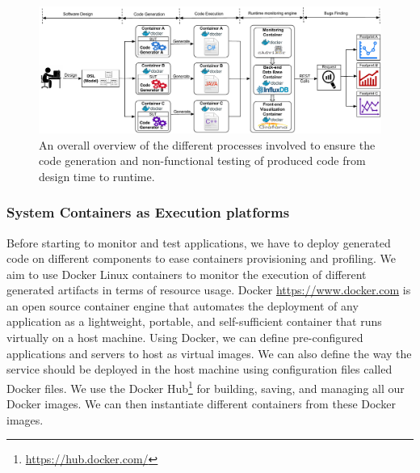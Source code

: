 \begin{figure}[!h]
	\includegraphics[width=1\linewidth]{Ressources/background2.pdf}
	\caption{An overall overview of the different processes involved to ensure the code generation and non-functional testing of produced code from design time to runtime.}
\end{figure}


\subsubsection{System Containers as Execution platforms}





Before starting to monitor and test applications, we have to deploy generated code on different components to ease containers provisioning and profiling. 
We aim to use Docker Linux containers to monitor the execution of different generated artifacts in terms of resource usage. 
Docker {\url{https://www.docker.com}} is an open source container engine that automates the deployment of any application as a lightweight, portable, and self-sufficient container that runs virtually on a host machine. 
Using Docker, we can define pre-configured applications and servers to host as virtual images. We can also define the way the service should be deployed in the host machine using configuration files called Docker files. 
We use the Docker Hub\footnote{\url{https://hub.docker.com/}} for building, saving, and managing all our Docker images. 
We can then instantiate different containers from these Docker images. 

